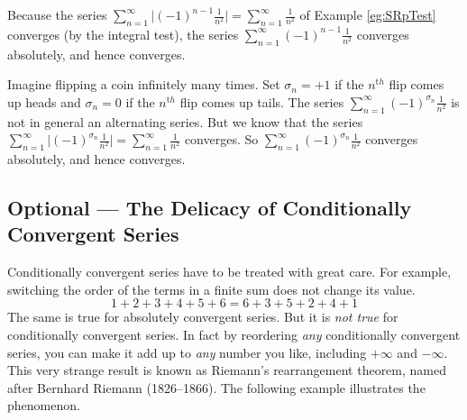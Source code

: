 \begin{eg}[$\sum_{n=1}^\infty(-1)^{n-1}\frac{1}{n^2}$]\label{eg:SRabsCondB}
Because the series $\sum_{n=1}^\infty\big|(-1)^{n-1}\frac{1}{n^2}\big|
=\sum\limits_{n=1}^\infty\frac{1}{n^2}$
of Example \ref{eg:SRpTest} converges (by the integral test),
the series $\sum\limits_{n=1}^\infty(-1)^{n-1}\frac{1}{n^2}$
converges absolutely, and hence converges.

\end{eg}

\begin{eg}\label{eg:SRabsCondC}
Imagine flipping a coin infinitely many times. Set $\sigma_n=+1$
if the $n^{\mathrm th}$ flip comes up heads and $\sigma_n=0$
if the $n^{\mathrm th}$ flip comes up tails. The series
$\sum_{n=1}^\infty(-1)^{\sigma_n}\frac{1}{n^2}$ is not in general
an alternating series. But we know that the series $\sum_{n=1}^\infty\big|(-1)^{\sigma_n}\frac{1}{n^2}\big|
=\sum\limits_{n=1}^\infty\frac{1}{n^2}$
converges. So $\sum_{n=1}^\infty(-1)^{\sigma_n}\frac{1}{n^2}$
converges absolutely, and hence converges.
\end{eg}

\subsection{Optional --- The Delicacy of Conditionally Convergent Series}

Conditionally convergent series have to be treated with great care.
For example, switching the order of the terms in a finite
sum does not change its value.
\begin{equation*}
1+2+3+4+5+6 = 6+3+5+2+4+1
\end{equation*}
The same is true for absolutely convergent series. But it is \emph{not true}
for conditionally convergent series. In fact by reordering \emph{any}
conditionally convergent series, you can make it add up to \emph{any}
number you like, including $+\infty$ and $-\infty$. This very strange
result is known as Riemann's rearrangement theorem, named after
Bernhard Riemann (1826--1866). The following example illustrates the
phenomenon.

